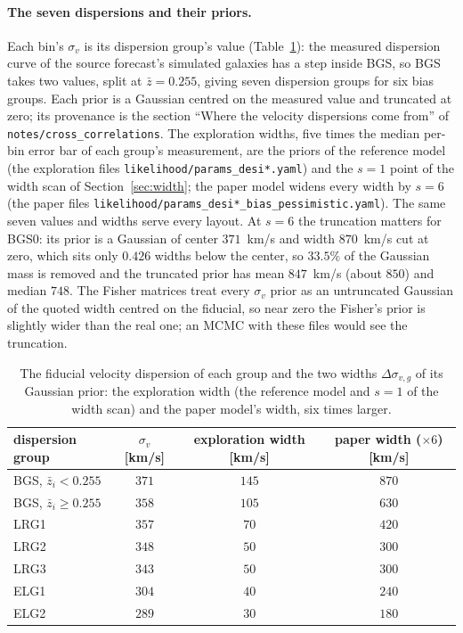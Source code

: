 \documentclass[11pt]{article}
\newcommand{\sv}{\sigma_v}
\newcommand{\us}{\_\allowbreak}
\begin{document}
\paragraph{The seven dispersions and their priors.}
Each bin's $\sv$ is its dispersion group's value
(Table~\ref{tab:sigv}): the measured dispersion curve of the source
forecast's simulated galaxies has a step inside BGS, so BGS takes two
values, split at $\bar{z} = 0.255$, giving seven dispersion groups for
six bias groups.  Each prior is a Gaussian centred on the measured
value and truncated at zero; its provenance is the section ``Where the
velocity dispersions come from'' of
\texttt{notes/cross\us correlations}.  The exploration widths, five
times the median per-bin error bar of each group's measurement, are
the priors of the
reference model (the exploration files
\texttt{likelihood/params\us desi*.yaml}) and the $s = 1$ point of the
width scan of Section~\ref{sec:width}; the paper model widens every
width by $s = 6$ (the paper files
\texttt{likelihood/params\us desi*\us bias\us pessimistic.yaml}).  The
same seven values and widths serve every layout.  At $s = 6$ the
truncation matters for BGS0: its prior is a Gaussian of center
$371$~km/s and width $870$~km/s cut at zero, which sits only $0.426$
widths below the center, so $33.5\%$ of the Gaussian mass is removed
and the truncated prior has mean $847$~km/s (about $850$) and median
$748$.  The Fisher matrices treat
every $\sv$ prior as an untruncated Gaussian of the quoted width
centred on the fiducial, so near zero the Fisher's prior is slightly
wider than the real one; an MCMC with these files would see the
truncation.

\begin{table}[ht]
  \centering
  \begin{tabular}{lccc}
    \hline
    dispersion group & $\sv$ [km/s] &
    exploration width [km/s] & paper width ($\times 6$) [km/s] \\
    \hline
    BGS, $\bar{z}_i < 0.255$ & $371$ & $145$ & $870$ \\
    BGS, $\bar{z}_i \ge 0.255$ & $358$ & $105$ & $630$ \\
    LRG1 & $357$ & $70$ & $420$ \\
    LRG2 & $348$ & $50$ & $300$ \\
    LRG3 & $343$ & $50$ & $300$ \\
    ELG1 & $304$ & $40$ & $240$ \\
    ELG2 & $289$ & $30$ & $180$ \\
    \hline
  \end{tabular}
  \caption{The fiducial velocity dispersion of each group and the two
    widths $\Delta\sigma_{v,g}$ of its Gaussian prior: the exploration
    width (the reference model and $s = 1$ of the width scan) and the
    paper model's width, six times larger.}
  \label{tab:sigv}
\end{table}
\end{document}

